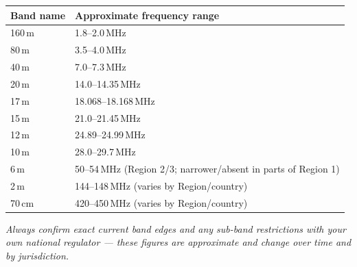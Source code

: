 \begin{center}
\renewcommand{\arraystretch}{1.1}
\begin{tabular}{@{}ll@{}}
\toprule
Band name & Approximate frequency range \\
\midrule
160\,m & 1.8--2.0\,MHz \\
80\,m & 3.5--4.0\,MHz \\
40\,m & 7.0--7.3\,MHz \\
20\,m & 14.0--14.35\,MHz \\
17\,m & 18.068--18.168\,MHz \\
15\,m & 21.0--21.45\,MHz \\
12\,m & 24.89--24.99\,MHz \\
10\,m & 28.0--29.7\,MHz \\
6\,m & 50--54\,MHz (Region 2/3; narrower/absent in parts of Region 1) \\
2\,m & 144--148\,MHz (varies by Region/country) \\
70\,cm & 420--450\,MHz (varies by Region/country) \\
\bottomrule
\end{tabular}
\end{center}
\noindent\textit{Always confirm exact current band edges and any
sub-band restrictions with your own national regulator --- these figures
are approximate and change over time and by jurisdiction.}
